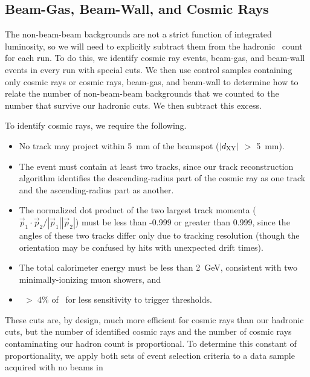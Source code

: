 \documentclass{cornell}
\begin{document}
\subsection{Beam-Gas, Beam-Wall, and Cosmic Rays}
\label{sec:bgbwcr}

The non-beam-beam backgrounds are not a strict function of integrated
luminosity, so we will need to explicitly subtract them from the
hadronic \ups\ count for each run.  To do this, we identify cosmic ray
events, beam-gas, and beam-wall events in every run with special cuts.
We then use control samples containing only cosmic rays or cosmic
rays, beam-gas, and beam-wall to determine how to relate the number of
non-beam-beam backgrounds that we counted to the number that survive
our hadronic cuts.  We then subtract this excess.

To identify cosmic rays, we require the following.
\begin{itemize}

  \item No track may project within 5~mm of the beamspot ($|d_{\mbox{\scriptsize XY}}|$ $>$
    5~mm).

  \item The event must contain at least two tracks, since our track
    reconstruction algorithm identifies the descending-radius part of
    the cosmic ray as one track and the ascending-radius part as
    another.

  \item The normalized dot product of the two largest track momenta
    ($\vec{p}_1 \cdot \vec{p}_2 / |\vec{p}_1| |\vec{p}_2|$) must be
    less than -0.999 or greater than 0.999, since the angles of these
    two tracks differ only due to tracking resolution (though the
    orientation may be confused by hits with unexpected drift times).

  \item The total calorimeter energy must be less than 2~GeV,
    consistent with two minimally-ionizing muon showers, and

  \item \visen\ $>$ 4\% of \ecm\ for less sensitivity to trigger
    thresholds.

\end{itemize}
These cuts are, by design, much more efficient for cosmic rays than
our hadronic cuts, but the number of identified cosmic rays and the
number of cosmic rays contaminating our hadron count is proportional.
To determine this constant of proportionality, we apply both sets of
event selection criteria to a data sample acquired with no beams in
\end{document}
